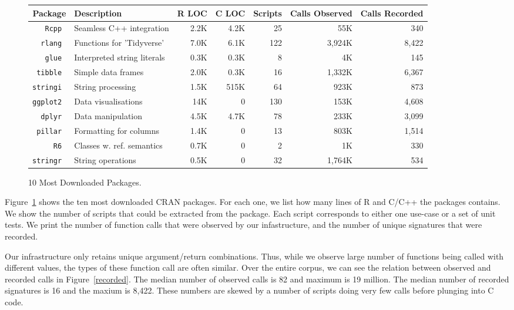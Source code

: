 \documentclass[acmsmall,10pt,review,anonymous]{acmart}\settopmatter{printfolios=true,printccs=false,printacmref=false}
\begin{document}
\begin{figure}[!th]{\footnotesize\begin{tabular}{@{}r||l|r|r|r|r|r@{}}\hline
\bf Package & \bf Description & \bf R LOC &\bf C LOC &\bf Scripts & \bf Calls Observed & \bf Calls Recorded \\
\hline
\tt Rcpp  & Seamless C++ integration & 2.2K & 4.2K & 25 & 55K & 340 \\
\tt rlang & Functions for 'Tidyverse' & 7.0K & 6.1K & 122 & 3,924K & 8,422 \\
\tt glue  & Interpreted string literals & 0.3K & 0.3K & 8 & 4K & 145 \\
\tt tibble & Simple data frames & 2.0K & 0.3K & 16 & 1,332K & 6,367 \\
\tt stringi &  String processing & 1.5K & 515K & 64 & 923K & 873 \\
\tt ggplot2 & Data visualisations & 14K & 0 & 130 & 153K & 4,608 \\
\tt dplyr  &  Data manipulation & 4.5K & 4.7K & 78 & 233K & 3,099 \\
\tt pillar & Formatting for columns & 1.4K & 0 & 13 & 803K & 1,514 \\
\tt R6 & Classes w. ref. semantics & 0.7K & 0 & 2 & 1K & 330 \\
\tt stringr & String operations & 0.5K & 0 & 32 & 1,764K & 534 \\
\end{tabular}}\caption{10 Most Downloaded Packages.}\label{most}
\end{figure}

Figure~\ref{most} shows the ten most downloaded CRAN packages.  For each
one, we list how many lines of R and C/C++ the packages contains.  We show
the number of scripts that could be extracted from the package. Each script
corresponds to either one use-case or a set of unit tests. We print the
number of function calls that were observed by our infastructure, and the
number of unique signatures that were recorded.

Our infrastructure only retains unique argument/return combinations. Thus,
while we observe large number of functions being called with different
values, the types of these function call are often similar. Over the entire
corpus, we can see the relation between observed and recorded calls in
Figure~\ref{recorded}.  The median number of observed calls is 82 and
maximum is 19 million.  The median number of recorded signatures is 16 and
the maxium is 8,422. These numbers are skewed by a number of scripts doing
very few calls before plunging into C code.
\end{document}
